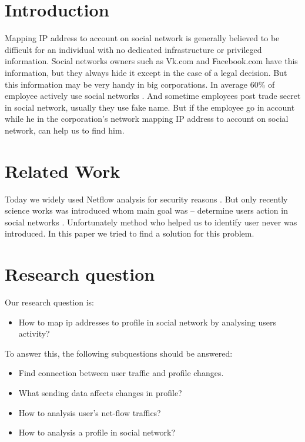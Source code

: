 \documentclass[12pt,a4paper]{report}
\begin{document}
\section{Introduction}
Mapping IP address to account on social network is generally believed to be difficult for an individual with no dedicated infrastructure or privileged information. Social networks owners such as Vk.com and Facebook.com have this information, but they always hide it except in the case of a legal decision. But this information may be very handy in big corporations. In average 60\% of employee actively use social networks \cite{ciferki}. And sometime employees post trade secret in social network, usually they use fake name. But if the employee go in  account while he in the corporation's network mapping IP address to account on social network, can help us to find him.

\section{Related Work}
Today we widely used Netflow analysis for security reasons \cite{IDS}\cite{Analys}. But only recently science works was introduced whom main goal was – determine users action in social networks \cite{Work1} \cite{Work2}. Unfortunately method who helped us to identify user never was introduced. In this paper we tried to find a solution for this problem.

\section{Research question}
Our research question is: 
\begin{itemize}
	\item{How to map ip addresses to profile in social network by analysing users activity? }
\end{itemize}

To answer this, the following subquestions should be answered:
\begin{itemize}
	\item{Find connection between user traffic and profile changes.}
	\item{What sending data affects changes in profile?}
	\item{How to analysis user's net-flow traffics?}
	\item{How to analysis a profile in social network?}
\end{itemize}
\end{document}
